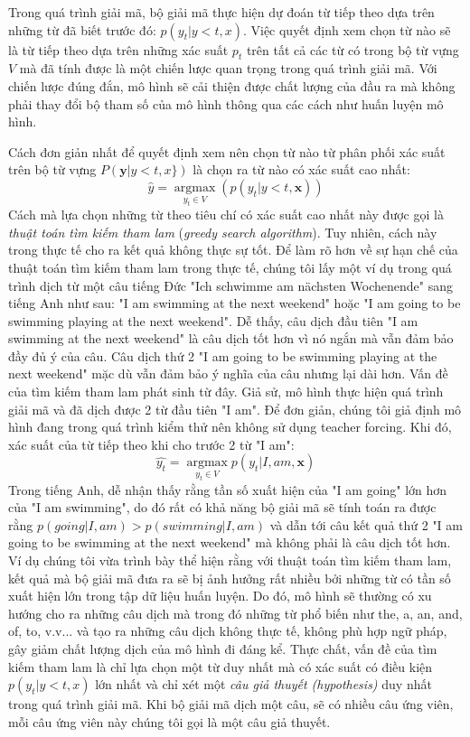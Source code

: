 Trong quá trình giải mã, bộ giải mã thực hiện dự đoán từ tiếp theo dựa trên những từ đã biết trước đó: $p(y_t | y<t, x)$. Việc quyết định xem chọn từ nào sẽ là từ tiếp theo dựa trên những xác suất $p_t$ trên tất cả các từ có trong bộ từ vựng $V$ mà đã tính được là một chiến lược quan trọng trong quá trình giải mã. Với chiến lược đúng đắn, mô hình sẽ cải thiện được chất lượng của đầu ra mà không phải thay đổi bộ tham số của mô hình thông qua các cách như huấn luyện mô hình.

Cách đơn giản nhất để quyết định xem nên chọn từ nào từ phân phối xác suất trên bộ từ vựng $P(\bm{y} | y<t, x\})$ là chọn ra từ nào có xác suất cao nhất:
\begin{equation}
\hat{y} = \operatorname*{argmax}_{y_t \in V} (p(y_t | y < t, \bm{x}))
\end{equation}
Cách mà lựa chọn những từ theo tiêu chí có xác suất cao nhất này được gọi là \textit{thuật toán tìm kiếm tham lam} (\textit{greedy search algorithm}). Tuy nhiên, cách này trong thực tế cho ra kết quả không thực sự tốt. Để làm rõ hơn về sự hạn chế của thuật toán tìm kiếm tham lam trong thực tế, chúng tôi lấy một ví dụ trong quá trình dịch từ một câu tiếng Đức "Ich schwimme am nächsten Wochenende" sang tiếng Anh như sau: "I am swimming at the next weekend" hoặc "I am going to be swimming playing at the next weekend". Dễ thấy, câu dịch đầu tiên "I am swimming at the next weekend" là câu dịch tốt hơn vì nó ngắn mà vẫn đảm bảo đầy đủ ý của câu. Câu dịch thứ 2 "I am going to be swimming playing at the next weekend" mặc dù vẫn đảm bảo ý nghĩa của câu nhưng lại dài hơn. Vấn đề của tìm kiếm tham lam phát sinh từ đây. Giả sử, mô hình thực hiện quá trình giải mã và đã dịch được 2 từ đầu tiên "I am". Để đơn giản, chúng tôi giả định mô hình đang trong quá trình kiểm thử nên không sử dụng teacher forcing. Khi đó, xác suất của từ tiếp theo khi cho trước 2 từ "I am":
\begin{equation*}
\hat{y_t} = \operatorname*{argmax}_{y_t \in V} p(y_t | I, am, \bm{x})
\end{equation*}
Trong tiếng Anh, dễ nhận thấy rằng tần số xuất hiện của "I am going" lớn hơn của "I am swimming", do đó rất có khả năng bộ giải mã sẽ tính toán ra được rằng $p(going | I, am) > p(swimming|I, am)$ và dẫn tới câu kết quả thứ 2 "I am going to be swimming at the next weekend" mà không phải là câu dịch tốt hơn. Ví dụ chúng tôi vừa trình bày thể hiện rằng với thuật toán tìm kiếm tham lam, kết quả mà bộ giải mã đưa ra sẽ bị ảnh hưởng rất nhiều bởi những từ có tần số xuất hiện lớn trong tập dữ liệu huấn luyện. Do đó, mô hình sẽ thường có xu hướng cho ra những câu dịch mà trong đó những từ phổ biến như the, a, an, and, of, to, v.v... và tạo ra những câu dịch không thực tế, không phù hợp ngữ pháp, gây giảm chất lượng dịch của mô hình đi đáng kể. Thực chất, vấn đề của tìm kiếm tham lam là chỉ lựa chọn một từ duy nhất mà có xác suất có điều kiện $p(y_t | y < t, x)$ lớn nhất và chỉ xét một \textit{câu giả thuyết (hypothesis)} duy nhất trong quá trình giải mã. Khi bộ giải mã dịch một câu, sẽ có nhiều câu ứng viên, mỗi câu ứng viên này chúng tôi gọi là một câu giả thuyết.

